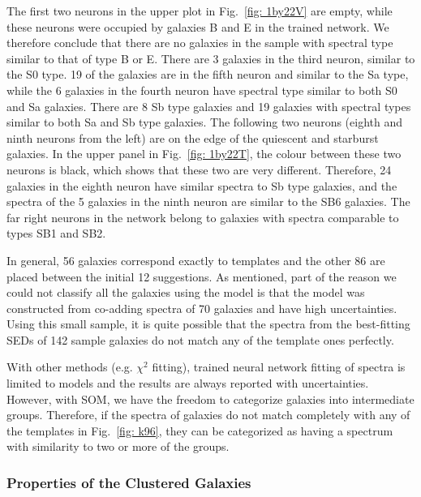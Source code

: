             The first two neurons in the upper plot in Fig.~\ref{fig: 1by22V} are empty, while these neurons were occupied by galaxies B and E in the trained network.
            We therefore conclude that there are no galaxies in the  sample with spectral type similar to that of type B or E.
            There are 3 galaxies in the third neuron, similar to the S0 type. 
            19 of the galaxies are in the fifth neuron and similar to the Sa type, while the 6 galaxies in the fourth neuron have spectral type similar to both S0 and Sa galaxies.
            There are 8 Sb type galaxies and 19 galaxies with spectral types similar to both Sa and Sb type galaxies.
            The following two neurons (eighth and ninth neurons from the left) are on the edge of the quiescent and starburst galaxies.
            In the upper panel in Fig.~\ref{fig: 1by22T}, the colour between these two neurons is black, which shows that these two are very different.
            Therefore, 24 galaxies in the eighth neuron have similar spectra to Sb type galaxies, and the spectra of the 5 galaxies in the ninth neuron are similar to the SB6 galaxies.
            The far right neurons in the network belong to galaxies with spectra comparable to types SB1 and SB2.
            
            In general, 56 galaxies correspond exactly to  templates and the other 86 are placed between the initial 12 suggestions.
            As  mentioned, part of the reason we could not classify all the galaxies using the  model is that the model was constructed from co-adding spectra of 70 galaxies and have high uncertainties.
            Using this small sample, it is quite possible that the spectra from the best-fitting SEDs of 142 sample galaxies do not match any of the template ones perfectly. 
            
           With other methods (e.g. $\chi^2$ fitting), trained neural network fitting of spectra is limited to models and the results are always reported with uncertainties.
            However, with SOM, we have the freedom to categorize galaxies into intermediate groups.
            Therefore, if the spectra of galaxies do not match completely with any of the  templates in Fig.~\ref{fig: k96}, they can be categorized as having a spectrum with similarity to two or more of the groups.
    
    \subsubsection{Properties of the Clustered Galaxies}
        
